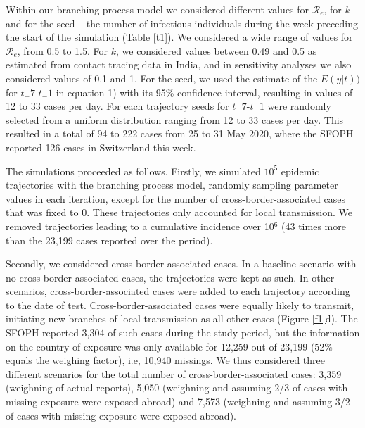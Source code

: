 \documentclass[10pt, a4paper, twoside]{article}
\begin{document}
\begin{multicols}{2}
Within our branching process model we considered different values for $\mathcal{R}_e$, for $k$ and for the seed -- the number of infectious individuals during the week preceding the start of the simulation (Table \ref{t1}).
We considered a wide range of values for $\mathcal{R}_e$, from 0.5 to 1.5.
For $k$, we considered values between 0.49 and 0.5 as estimated from contact tracing data in India\cite{laxminarayan_epidemiology_2020}, and in sensitivity analyses we also considered values of 0.1 and 1.\cite{taube_open-access_2021}
For the seed, we used the estimate of the $E(y|t))$ for $t_-7$-$t_-1$ in equation 1) with its 95\% confidence interval, resulting in values of 12 to 33 cases per day.
For each trajectory seeds for $t_-7$-$t_-1$  were randomly selected from a uniform distribution ranging from 12 to 33 cases per day.
This resulted in a total of 94 to 222 cases from 25 to 31 May 2020, where the SFOPH reported 126 cases in Switzerland this week.

The simulations proceeded as follows.
Firstly, we simulated $10^5$ epidemic trajectories with the branching process model, randomly sampling parameter values in each iteration, except for the number of cross-border-associated cases that was fixed to 0.
These trajectories only accounted for local transmission.
We removed trajectories leading to a cumulative incidence over 10$^6$ (43 times more than the 23,199 cases reported over the period).

Secondly, we considered cross-border-associated cases.
In a baseline scenario with no cross-border-associated cases, the trajectories were kept as such.
In other scenarios, cross-border-associated cases were added to each trajectory according to the date of test.
Cross-border-associated cases were equally likely to transmit, initiating new branches of local transmission as all other cases (Figure \ref{f1}d).
The SFOPH reported 3,304 of such cases during the study period, but the information on the country of exposure was only available for 12,259 out of 23,199 (52\% equals the weighing factor), i.e, 10,940 missings.
We thus considered three different scenarios for the total number of cross-border-associated cases: 3,359 (weighning of actual reports), 5,050 (weighning and assuming 2/3 of cases with missing exposure were exposed abroad) and 7,573 (weighning and assuming 3/2 of cases with missing exposure were exposed abroad).



\end{multicols}
\end{document}
